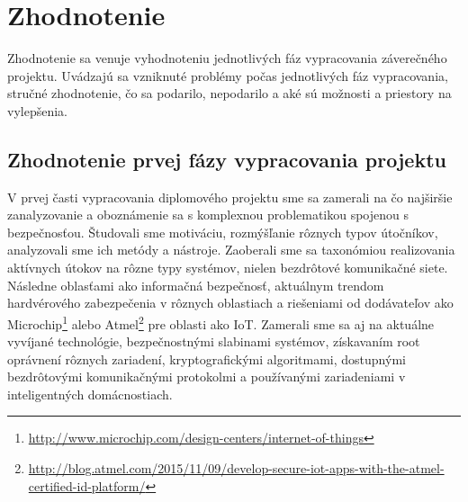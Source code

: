 \documentclass[12pt,a4paper,oneside,openright]{report}
\begin{document}
\chapter{Zhodnotenie} \label{s_conclusion}

Zhodnotenie sa venuje vyhodnoteniu jednotlivých fáz vypracovania záverečného projektu. Uvádzajú sa vzniknuté problémy počas jednotlivých fáz vypracovania, stručné zhodnotenie, čo sa podarilo, nepodarilo a aké sú možnosti a priestory na vylepšenia.

\section{Zhodnotenie prvej fázy vypracovania projektu}
V prvej časti vypracovania diplomového projektu sme sa zamerali na čo najširšie zanalyzovanie a oboznámenie sa s komplexnou problematikou spojenou s bezpečnosťou. Študovali sme motiváciu, rozmýšľanie rôznych typov útočníkov, analyzovali sme ich metódy a nástroje. Zaoberali sme sa taxonómiou realizovania aktívnych útokov na rôzne typy systémov, nielen bezdrôtové komunikačné siete. Následne oblasťami ako informačná bezpečnosť, aktuálnym trendom hardvérového zabezpečenia v rôznych oblastiach a riešeniami od dodávateľov ako Microchip\footnote{\url{http://www.microchip.com/design-centers/internet-of-things}} alebo Atmel\footnote{\url{http://blog.atmel.com/2015/11/09/develop-secure-iot-apps-with-the-atmel-certified-id-platform/}} pre oblasti ako IoT. Zamerali sme sa aj na aktuálne vyvíjané technológie, bezpečnostnými slabinami systémov, získavaním root oprávnení rôznych zariadení, kryptografickými algoritmami, dostupnými bezdrôtovými komunikačnými protokolmi a používanými zariadeniami v inteligentných domácnostiach.

\end{document}

